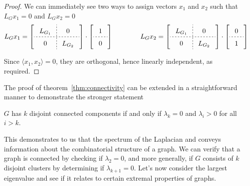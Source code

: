 \begin{proof}
We can immediately see two ways to assign vectors $x_1$ and $x_2$ such that $L_G x_1 = 0$ and $L_G x_2 = 0$
\begin{equation*}
\arraycolsep=8pt\def\arraystretch{1.5}
L_G x_1 = \left[
  \begin{array}{c;{2pt/2pt}c}
    L_{G_1} & 0 \\ \hdashline[2pt/2pt]
    0 & L_{G_2}
  \end{array}
\right]
\cdot
\left[
  \begin{array}{c}
    1 \\ \hdashline[2pt/2pt]
    0
  \end{array}
\right]
\qquad\qquad
L_G x_2 = \left[
  \begin{array}{c;{2pt/2pt}c}
    L_{G_1} & 0 \\ \hdashline[2pt/2pt]
    0 & L_{G_2}
  \end{array}
\right]
\cdot
\left[
  \begin{array}{c}
    0 \\ \hdashline[2pt/2pt]
    1
  \end{array}
\right]
\end{equation*}

Since $\langle x_1, x_2 \rangle = 0$, they are orthogonal, hence linearly independent, as required.
\end{proof}

The proof of theorem~\ref{thm:connectivity} can be extended in a straightforward manner to demonstrate the stronger statement

\begin{corollary}
$G$ has $k$ disjoint connected components if and only if $\lambda_k = 0$ and $\lambda_i > 0$ for all $i > k$.
\end{corollary}

This demonstrates to us that the spectrum of the Laplacian and conveys information about the combinatorial structure of a graph. We can verify that a graph is connected by checking if $\lambda_2 = 0$, and more generally, if $G$ consists of $k$ disjoint clusters by determining if $\lambda_{k+1} = 0$. Let's now consider the largest eigenvalue and see if it relates to certain extremal properties of graphs.
